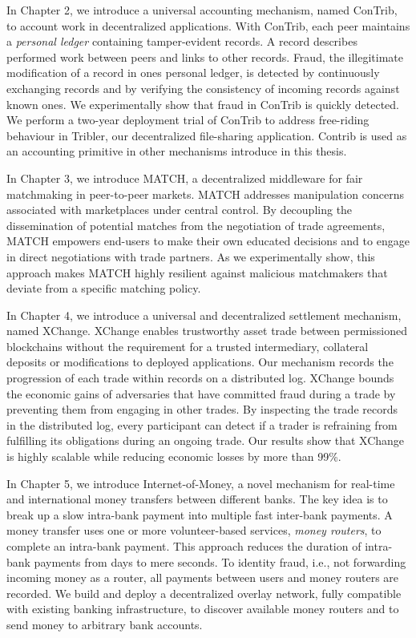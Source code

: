 In Chapter 2, we introduce a universal accounting mechanism, named ConTrib, to account work in decentralized applications.
With ConTrib, each peer maintains a \emph{personal ledger} containing tamper-evident records.
A record describes performed work between peers and links to other records.
Fraud, the illegitimate modification of a record in ones personal ledger, is detected by continuously exchanging records and by verifying the consistency of incoming records against known ones.
We experimentally show that fraud in ConTrib is quickly detected.
We perform a two-year deployment trial of ConTrib to address free-riding behaviour in Tribler, our decentralized file-sharing application.
Contrib is used as an accounting primitive in other mechanisms introduce in this thesis.

In Chapter 3, we introduce MATCH, a decentralized middleware for fair matchmaking in peer-to-peer markets.
MATCH addresses manipulation concerns associated with marketplaces under central control.
By decoupling the dissemination of potential matches from the negotiation of trade agreements, MATCH empowers end-users to make their own educated decisions and to engage in direct negotiations with trade partners.
As we experimentally show, this approach makes MATCH highly resilient against malicious matchmakers that deviate from a specific matching policy.

In Chapter 4, we introduce a universal and decentralized settlement mechanism, named XChange.
XChange enables trustworthy asset trade between permissioned blockchains without the requirement for a trusted intermediary, collateral deposits or modifications to deployed applications.
Our mechanism records the progression of each trade within records on a distributed log.
XChange bounds the economic gains of adversaries that have committed fraud during a trade by preventing them from engaging in other trades.
By inspecting the trade records in the distributed log, every participant can detect if a trader is refraining from fulfilling its obligations during an ongoing trade.
Our results show that XChange is highly scalable while reducing economic losses by more than 99\%.

In Chapter 5, we introduce Internet-of-Money, a novel mechanism for real-time and international money transfers between different banks.
The key idea is to break up a slow intra-bank payment into multiple fast inter-bank payments.
A money transfer uses one or more volunteer-based services, \emph{money routers}, to complete an intra-bank payment.
This approach reduces the duration of intra-bank payments from days to mere seconds.
To identity fraud, i.e., not forwarding incoming money as a router, all payments between users and money routers are recorded.
We build and deploy a decentralized overlay network, fully compatible with existing banking infrastructure, to discover available money routers and to send money to arbitrary bank accounts.

